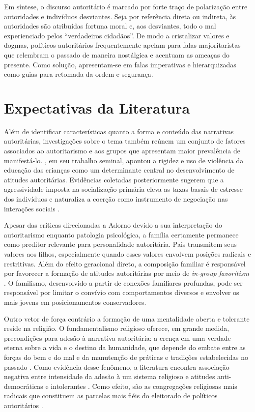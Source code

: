 \documentclass[
12pt,				%
openright,			%
twoside,			%
a4paper,			%
english,			%
french,				%
spanish,			%
brazil				%
]{abntex2}
\begin{document}
Em síntese, o discurso autoritário é marcado por forte traço de polarização entre autoridades e indivíduos desviantes. Seja por referência direta ou indireta, às autoridades são atribuídas fortuna moral e, aos desviantes, todo o mal experienciado pelos ``verdadeiros cidadãos''. De modo a cristalizar valores e dogmas, políticos autoritários frequentemente apelam para falas majoritaristas que relembram o passado de maneira nostálgica e acentuam as ameaças do presente. Como solução, apresentam-se em falas imperativas e hierarquizadas como guias para retomada da ordem e segurança. 

\section{Expectativas da Literatura}

Além de identificar características quanto a forma e conteúdo das narrativas autoritárias, investigações sobre o tema também reúnem um conjunto de fatores associados ao autoritarismo e aos grupos que apresentam maior prevalência de manifestá-lo. , em seu trabalho seminal, apontou a rigidez e uso de violência da educação das crianças como um determinante central no desenvolvimento de atitudes autoritárias. Evidências coletadas posteriormente sugerem que a agressividade imposta na socialização primária eleva as taxas basais de estresse dos indivíduos e naturaliza a coerção como instrumento de negociação nas interações sociais \cite{hopf1993authoritarians, van2009authoritarianism}.

Apesar das críticas direcionadas a Adorno devido a sua interpretação do autoritarismo enquanto patologia psicológica, a família certamente permanece como preditor relevante para personalidade autoritária. Pais transmitem seus valores aos filhos, especialmente quando esses valores envolvem posições radicais e restritivas. Além do efeito geracional direto, a composição familiar é responsável por favorecer a formação de atitudes autoritárias por meio de \emph{in-group favoritism} \cite{lewis2014common, altemeyer2006authoritarians}. O familismo, desenvolvido a partir de conexões familiares profundas, pode ser responsável por limitar o convívio com comportamentos diversos e envolver os mais jovens em posicionamentos conservadores.

Outro vetor de força contrário a formação de uma mentalidade aberta e tolerante reside na religião. O fundamentalismo religioso oferece, em grande medida, precondições para adesão à narrativa autoritária: a crença em uma verdade eterna sobre a vida e o destino da humanidade, que depende do embate entre as forças do bem e do mal e da manutenção de práticas e tradições estabelecidas no passado \cite{rokeach1956political,rokeach1960open}. Como evidência desse fenômeno, a literatura encontra associação negativa entre intensidade da adesão à um sistema religioso e atitudes anti-democráticas e intolerantes \cite{pereira2001sistemas,pereira2004sistemas,fuks2012atitudes}. Como efeito, são as congregações religiosas mais radicais que constituem as parcelas mais fiéis do eleitorado de políticos autoritários \cite{mudde2013exclusionary, betz2016against}.
\end{document}
